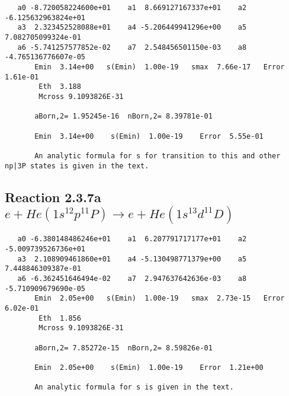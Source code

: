 \documentclass[12pt,dvipdfmx]{article}
\begin{document}
\begin{small}\begin{verbatim}
   a0 -8.720058224600e+01    a1  8.669127167337e+01    a2 -6.125632963824e+01
   a3  2.323452528088e+01    a4 -5.206449941296e+00    a5  7.082705099324e-01
   a6 -5.741257577852e-02    a7  2.548456501150e-03    a8 -4.765136776607e-05
       Emin  3.14e+00   s(Emin)  1.00e-19   smax  7.66e-17   Error  1.61e-01
        Eth  3.188
        Mcross 9.1093826E-31

       aBorn,2= 1.95245e-16  nBorn,2= 8.39781e-01

       Emin  3.14e+00    s(Emin)  1.00e-19    Error  5.55e-01

       An analytic formula for s for transition to this and other np|3P states is given in the text.
\end{verbatim}\end{small}









\newpage
\subsection{
Reaction 2.3.7a $e + He(1s^12p^11P) \rightarrow e + He(1s^13d^11D)$}

















\begin{small}\begin{verbatim}
   a0 -6.380148486246e+01    a1  6.207791717177e+01    a2 -5.009739526736e+01
   a3  2.108909461860e+01    a4 -5.130498771379e+00    a5  7.448846309387e-01
   a6 -6.362451646494e-02    a7  2.947637642636e-03    a8 -5.710909679690e-05
       Emin  2.05e+00   s(Emin)  1.00e-19   smax  2.73e-15   Error  6.02e-01
        Eth  1.856
        Mcross 9.1093826E-31

       aBorn,2= 7.85272e-15  nBorn,2= 8.59826e-01

       Emin  2.05e+00    s(Emin)  1.00e-19    Error  1.21e+00

       An analytic formula for s is given in the text.
\end{verbatim}\end{small}
\end{document}
